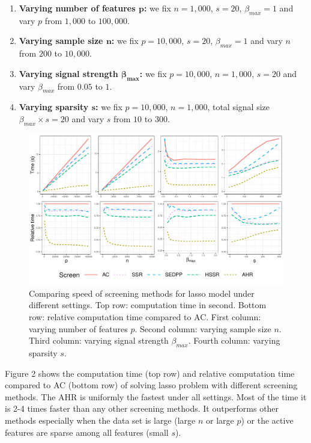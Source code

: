 \begin{enumerate}
    \item \textbf{Varying number of features $\mathbf{p}$:} we fix $n=1,000$, $s=20$, $\beta_{max}=1$ and vary $p$ from $1,000$ to $100,000$.
    \item \textbf{Varying sample size $\mathbf{n}$:} we fix $p=10,000$, $s=20$, $\beta_{max}=1$ and vary $n$ from $200$ to $10,000$.
    \item \textbf{Varying signal strength $\mathbf{\beta_{max}}$:} we fix $p=10,000$, $n=1,000$, $s=20$ and vary $\beta_{max}$ from $0.05$ to $1$.
    \item \textbf{Varying sparsity $\mathbf{s}$:} we fix $p=10,000$, $n=1,000$, total signal size $\beta_{max}\times s=20$ and vary $s$ from $10$ to $300$.
\end{enumerate}

\begin{figure}[h]
    \centering
    \includegraphics[scale = 0.59]{plots/gaus1.pdf}    \caption{Comparing speed of screening methods for lasso model under different settings. Top row: computation time in second. Bottom row: relative computation time compared to AC. First column: varying number of features $p$. Second column: varying sample size $n$. Third column: varying signal strength $\beta_{max}$. Fourth column: varying sparsity $s$.}
    \label{fig:5.1.1}
\end{figure}

Figure 2 shows the computation time (top row) and relative computation time compared to AC (bottom row) of solving lasso problem with different screening methods. The AHR is uniformly the fastest under all settings. Most of the time it is 2-4 times faster than any other screening methods. It outperforms other methods especially when the data set is large (large $n$ or large $p$) or the active features are sparse among all features (small $s$). 

